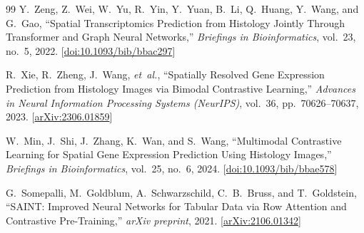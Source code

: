 \documentclass[conference]{IEEEtran}
\begin{document}
\begin{thebibliography}{99}
Y.~Zeng, Z.~Wei, W.~Yu, R.~Yin, Y.~Yuan, B.~Li, Q.~Huang,
Y.~Wang, and G.~Gao,
``Spatial Transcriptomics Prediction from Histology Jointly Through
Transformer and Graph Neural Networks,''
\textit{Briefings in Bioinformatics}, vol.~23, no.~5, 2022.
[\href{https://doi.org/10.1093/bib/bbac297}{doi:10.1093/bib/bbac297}]

R.~Xie, R.~Zheng, J.~Wang, \textit{et~al.},
``Spatially Resolved Gene Expression Prediction from Histology Images
via Bimodal Contrastive Learning,''
\textit{Advances in Neural Information Processing Systems (NeurIPS)},
vol.~36, pp.~70626--70637, 2023.
[\href{https://arxiv.org/abs/2306.01859}{arXiv:2306.01859}]

W.~Min, J.~Shi, J.~Zhang, K.~Wan, and S.~Wang,
``Multimodal Contrastive Learning for Spatial Gene Expression Prediction
Using Histology Images,''
\textit{Briefings in Bioinformatics}, vol.~25, no.~6, 2024.
[\href{https://doi.org/10.1093/bib/bbae578}{doi:10.1093/bib/bbae578}]

G.~Somepalli, M.~Goldblum, A.~Schwarzschild, C.~B.~Bruss,
and T.~Goldstein,
``SAINT: Improved Neural Networks for Tabular Data via Row Attention
and Contrastive Pre-Training,''
\textit{arXiv preprint}, 2021.
[\href{https://arxiv.org/abs/2106.01342}{arXiv:2106.01342}]



\end{thebibliography}
\end{document}
